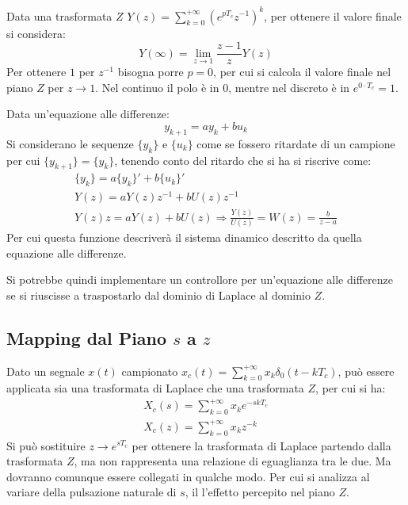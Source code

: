 \documentclass{article}
\numberwithin{equation}{subsection}
\begin{document}
Data una trasformata $Z$ $Y(z)=\displaystyle\sum_{k=0}^{+\infty}(e^{pT_c}z^{-1})^k$, per ottenere il valore finale si considera:
\begin{equation}
    Y(\infty)=\lim_{z\to1}\displaystyle\frac{z-1}{z}Y(z)
\end{equation}
Per ottenere $1$ per $z^{-1}$ bisogna porre $p=0$, per cui si calcola il valore finale nel piano $Z$ per $z\to1$. Nel continuo il polo è in $0$, mentre nel discreto è in 
$e^{0\cdot T_c}=1$.  


Data un'equazione alle differenze: 
\begin{equation}
    y_{k+1}=ay_k+bu_k
\end{equation}
Si considerano le sequenze $\{y_k\}$ e $\{u_k\}$ come se fossero ritardate di un campione per cui $\{y_{k+1}\}=\{y_k\}$, tenendo conto del ritardo che si ha si riscrive come:
\begin{gather}
    \{y_k\}=a\{y_k\}'+b\{u_k\}'\\
    Y(z)=aY(z)z^{-1}+bU(z)z^{-1}\\
    Y(z)z=aY(z)+bU(z)\Rightarrow \displaystyle\frac{Y(z)}{U(z)}=W(z)=\displaystyle\frac{b}{z-a}
\end{gather}
Per cui questa funzione descriverà il sistema dinamico descritto da quella equazione alle differenze. 

Si potrebbe quindi implementare un controllore per un'equazione alle differenze se si riuscisse a traspostarlo dal dominio di Laplace al dominio $Z$. 

\subsection{Mapping dal Piano $s$ a $z$}

Dato un segnale $x(t)$ campionato $x_c(t)=\displaystyle\sum_{k=0}^{+\infty}x_k\delta_0(t-kT_c)$, può essere applicata sia una trasformata di Laplace che una trasformata $Z$, per 
cui si ha:
\begin{gather}
    X_c(s)=\sum_{k=0}^{+\infty}x_ke^{-skT_c}\\
    X_c(z)=\sum_{k=0}^{+\infty}x_kz^{-k}
\end{gather}
Si può sostituire $z\to e^{sT_c}$ per ottenere la trasformata di Laplace partendo dalla trasformata $Z$, ma non rappresenta una relazione di eguaglianza tra le due. 
Ma dovranno comunque essere collegati in qualche modo. Per cui si analizza al variare della pulsazione naturale di $s$, il l'effetto percepito nel piano $Z$. 
\end{document}
